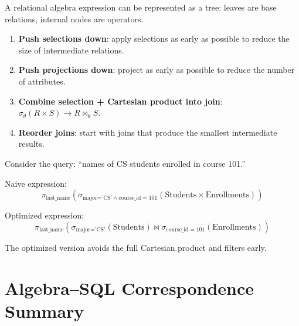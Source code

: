 A relational algebra expression can be represented as a tree: leaves are
base relations, internal nodes are operators.

\begin{theorem}
\begin{enumerate}
    \item \textbf{Push selections down}: apply selections as early as possible
          to reduce the size of intermediate relations.
    \item \textbf{Push projections down}: project as early as possible to
          reduce the number of attributes.
    \item \textbf{Combine selection + Cartesian product into join}:
          $\sigma_\theta(R \times S) \to R \bowtie_\theta S$.
    \item \textbf{Reorder joins}: start with joins that produce the smallest
          intermediate results.
\end{enumerate}
\end{theorem}

\begin{example}
Consider the query: ``names of CS students enrolled in course 101.''

Naive expression:
\[
\pi_{\text{last\_name}}(\sigma_{\text{major='CS'} \land \text{course\_id}=101}(\text{Students} \times \text{Enrollments}))
\]

Optimized expression:
\[
\pi_{\text{last\_name}}(\sigma_{\text{major='CS'}}(\text{Students}) \bowtie \sigma_{\text{course\_id}=101}(\text{Enrollments}))
\]

The optimized version avoids the full Cartesian product and filters early.
\end{example}

\section{Algebra--SQL Correspondence Summary}

